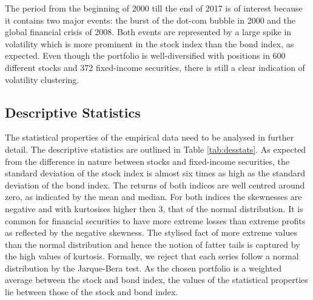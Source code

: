 \documentclass[a4paper,12pt]{article}
\theoremstyle{plain}
\begin{document}
The period from the beginning of 2000 till the end of 2017 is of interest because it contains two major events: the burst of the dot-com bubble in 2000 and the global financial crisis of 2008. Both events are represented by a large spike in volatility which is more prominent in the stock index than the bond index, as expected. Even though the portfolio is well-diversified with positions in 600 different stocks and 372 fixed-income securities, there is still a clear indication of volatility clustering.

\subsection{Descriptive Statistics}
The statistical properties of the empirical data need to be analysed in further detail. The descriptive statistics are outlined in Table \ref{tab:desstats}. As expected from the difference in nature between stocks and fixed-income securities, the standard deviation of the stock index is almost six times as high as the standard deviation of the bond index. The returns of both indices are well centred around zero, as indicated by the mean and median. For both indices the skewnesses are negative and with kurtosises higher then 3, that of the normal distribution. It is common for financial securities to have more extreme losses than extreme profits as reflected by the negative skewness. The stylised fact of more extreme values than the normal distribution and hence the notion of fatter tails is captured by the high values of kurtosis. Formally, we reject that each series follow a normal distribution by the Jarque-Bera test. As the chosen portfolio is a weighted average between the stock and bond index, the values of the statistical properties lie between those of the stock and bond index.


\begin{table}[H]
\captionsetup{width=.9\textwidth}
\caption{Descriptive statistics of the stock index, bond index, and portfolio returns.} 
\centering
\label{tab:desstats}
\end{table}\\
\end{document}
